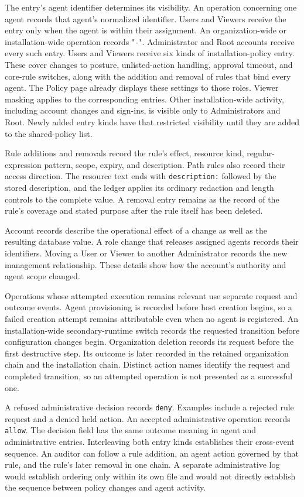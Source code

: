 The entry's agent identifier determines its visibility. An operation concerning one agent records that agent's normalized identifier. Users and Viewers receive the entry only when the agent is within their assignment. An organization-wide or installation-wide operation records "\texttt{-}". {\color{red}Administrator and Root accounts receive every such entry. Users and Viewers receive six kinds of installation-policy entry. These cover changes to posture, unlisted-action handling, approval timeout, and core-rule switches, along with the addition and removal of rules that bind every agent. The Policy page already displays these settings to those roles. Viewer masking applies to the corresponding entries. Other installation-wide activity, including account changes and sign-ins, is visible only to Administrators and Root. Newly added entry kinds have that restricted visibility until they are added to the shared-policy list.}

Rule additions and removals record the rule's effect, resource kind, regular-expression pattern, scope, expiry, and description. Path rules also record their access direction. The resource text ends with \texttt{description:} followed by the stored description, and the ledger applies its ordinary redaction and length controls to the complete value. A removal entry remains as the record of the rule's coverage and stated purpose after the rule itself has been deleted.

Account records describe the operational effect of a change as well as the resulting database value. A role change that releases assigned agents records their identifiers. Moving a User or Viewer to another Administrator records the new management relationship. These details show how the account's authority and agent scope changed.

Operations whose attempted execution remains relevant use separate request and outcome events. Agent provisioning is recorded before host creation begins, so a failed creation attempt remains attributable even when no agent is registered. An installation-wide secondary-runtime switch records the requested transition before configuration changes begin. Organization deletion records its request before the first destructive step. Its outcome is later recorded in the retained organization chain and the installation chain. Distinct action names identify the request and completed transition, so an attempted operation is not presented as a successful one.

A refused administrative decision records \texttt{deny}. Examples include a rejected rule request and a denied held action. An accepted administrative operation records \texttt{allow}. The decision field has the same outcome meaning in agent and administrative entries. Interleaving both entry kinds establishes their cross-event sequence. An auditor can follow a rule addition, an agent action governed by that rule, and the rule's later removal in one chain. A separate administrative log would establish ordering only within its own file and would not directly establish the sequence between policy changes and agent activity.


